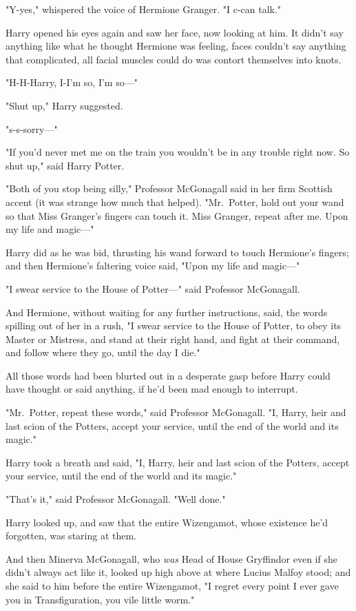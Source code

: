 "Y-yes," whispered the voice of Hermione Granger. "I c-can talk."

Harry opened his eyes again and saw her face, now looking at him. It didn't say
anything like what he thought Hermione was feeling, faces couldn't say anything
that complicated, all facial muscles could do was contort themselves into knots.

"H-H-Harry, I-I'm so, I'm so---"

"Shut up," Harry suggested.

"s-s-sorry---"

"If you'd never met me on the train you wouldn't be in any trouble right now.
So shut up," said Harry Potter.

"Both of you stop being silly," Professor McGonagall said in her firm Scottish
accent (it was strange how much that helped). "Mr.~Potter, hold out your wand
so that Miss Granger's fingers can touch it. Miss Granger, repeat after me.
Upon my life and magic---"

Harry did as he was bid, thrusting his wand forward to touch Hermione's
fingers; and then Hermione's faltering voice said, "Upon my life and magic---"

"I swear service to the House of Potter---" said Professor McGonagall.

And Hermione, without waiting for any further instructions, said, the words
spilling out of her in a rush, "I swear service to the House of Potter, to obey
its Master or Mistress, and stand at their right hand, and fight at their
command, and follow where they go, until the day I die."

All those words had been blurted out in a desperate gasp before Harry could
have thought or said anything, if he'd been mad enough to interrupt.

"Mr.~Potter, repeat these words," said Professor McGonagall. "I, Harry, heir
and last scion of the Potters, accept your service, until the end of the world
and its magic."

Harry took a breath and said, "I, Harry, heir and last scion of the Potters,
accept your service, until the end of the world and its magic."

"That's it," said Professor McGonagall. "Well done."

Harry looked up, and saw that the entire Wizengamot, whose existence he'd
forgotten, was staring at them.

And then Minerva McGonagall, who \emph{was} Head of House Gryffindor even if
she didn't always act like it, looked up high above at where Lucius Malfoy
stood; and she said to him before the entire Wizengamot, "I regret every point
I ever gave you in Transfiguration, you vile little worm."

